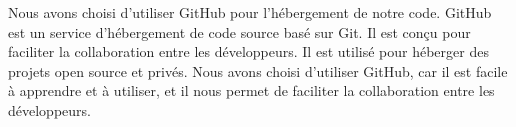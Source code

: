 Nous avons choisi d'utiliser GitHub pour l'hébergement de notre code. GitHub est
un service d'hébergement de code source basé sur Git. Il est conçu pour
faciliter la collaboration entre les développeurs. Il est utilisé pour
héberger des projets open source et privés. Nous avons choisi d'utiliser
GitHub, car il est facile à apprendre et à utiliser, et il nous permet de
faciliter la collaboration entre les développeurs.